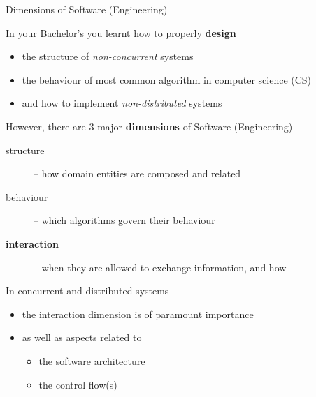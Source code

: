 \documentclass[presentation]{beamer}\mode<presentation>{\usetheme{AMSBolognaFC}}
\begin{document}
\begin{frame}[c,allowframebreaks]{Dimensions of Software (Engineering)}

    \begin{block}{In your Bachelor's you learnt how to properly \textbf{design}}
        \begin{itemize}
            \item the \alert{structure} of \emph{non-concurrent} systems
            \item the \alert{behaviour} of most common algorithm in computer science (CS)
            \item and how to implement \emph{non-distributed} systems
        \end{itemize}
    \end{block}

    \framebreak

    \begin{alertblock}{However, there are 3 major \textbf{dimensions} of Software (Engineering)}
        \begin{description}
            \item[structure] -- how domain entities are composed and related
            \item[behaviour] -- which algorithms govern their behaviour
            \item[\textbf{interaction}] -- when they are allowed to exchange information, and how
        \end{description}
    \end{alertblock}

    \framebreak

    \begin{exampleblock}{In concurrent and distributed systems}
        \begin{itemize}
            \item the interaction dimension is of paramount importance
            \item as well as aspects related to
            \begin{itemize}
                \item the \alert{software architecture}
                \item the \alert{control flow(s)}
            \end{itemize}
        \end{itemize}
    \end{exampleblock}


\end{frame}
\end{document}
